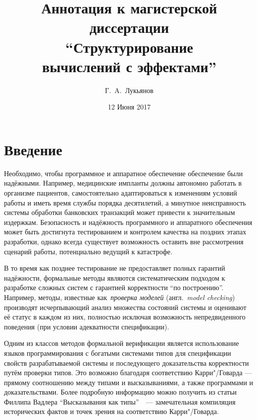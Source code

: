 \documentclass [fontsize=14pt, paper=a4, pagesize, DIV=calc]%
{article}
\begin{document}
\title{Аннотация к магистерской диссертации\\``Структурирование\\вычислений с эффектами''}
\author{Г.~A.~Лукьянов}
\date{12 Июня 2017}

\maketitle

\section{Введение}

Необходимо, чтобы программное и аппаратное обеспечение обеспечение были надёжными.
Например, медицинские импланты должны автономно работать в организме пациентов,
самостоятельно адаптироваться к изменениям условий работы и иметь время службы порядка
десятилетий, а минутное неисправность системы обработки банковских транзакций
может привести к значительным издержкам. Безопасность и надёжность программного и
аппаратного обеспечения может быть достигнута тестированием и контролем качества на
поздних этапах разработки, однако всегда существует возможность оставить вне
рассмотрения сценарий работы, потенциально ведущий к катастрофе.

В то время как позднее тестирование не предоставляет полных гарантий надёжности,
формальные методы являются систематическим подходом к разработке сложных систем
с гарантией корректности ``по построению''. Например, методы, известные
как~\emph{проверка моделей} (англ.~\emph{model checking}) производят исчерпывающий
анализ множества состояний системы и оценивают её статус в каждом из них, полностью
исключая возможность непредвиденного поведения (при условии адекватности спецификации).

Одним из классов методов формальной верификации является использование языков
программирования с богатыми системами типов для спецификации свойств разрабатываемой
системы и последующего доказательства корректности путём проверки типов.
Это возможно благодаря соответствию Карри"/Говарда --- прямому соотношению между
типами и высказываниями, а также программами и доказательствами. Более подробную
информацию можно получить из статьи Филлипа Вадлера
``Высказывания как типы''~\cite{Wadler:2015:PT:2847579.2699407}~---
замечательная компиляция исторических фактов и точек зрения на
соответствию Карри"/Говарда.
\end{document}
